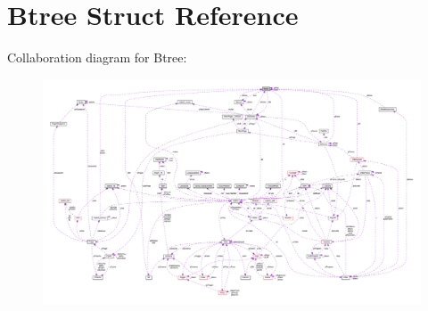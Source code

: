 \hypertarget{struct_btree}{\section{Btree Struct Reference}
\label{struct_btree}
}


Collaboration diagram for Btree\-:\nopagebreak
\begin{figure}[H]
\begin{center}
\leavevmode
\includegraphics[width=350pt]{struct_btree__coll__graph}
\end{center}
\end{figure}

